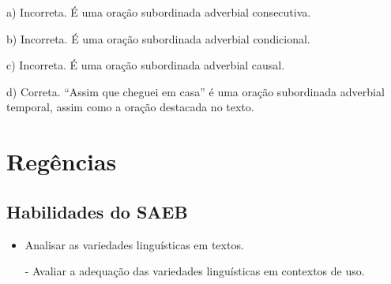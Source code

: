{\begin{itemize}
a) Incorreta. É uma oração subordinada adverbial consecutiva.

b) Incorreta. É uma oração subordinada adverbial condicional.

c) Incorreta. É uma oração subordinada adverbial causal.

d) Correta. ``Assim que cheguei em casa'' é uma oração subordinada
adverbial temporal, assim como a oração destacada no texto.

\chapter{Regências}

\section{Habilidades do SAEB}

\begin{itemize}
\item Analisar as variedades linguísticas em textos.

- Avaliar a adequação das variedades linguísticas em contextos de uso.

\end{itemize}
\end{itemize}}
